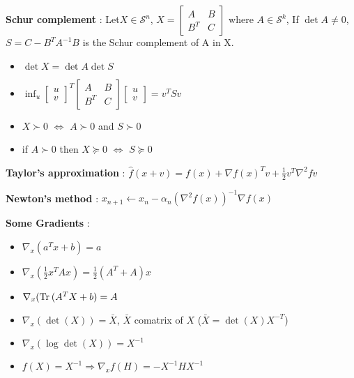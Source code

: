 \documentclass[a4paper, 10pt]{article}
\newcommand{\grad}[1]{\nabla{#1}}
\newcommand{\gradwrt}[2]{\nabla_#1{#2}}
\newcommand{\hess}[1]{\nabla^2{#1}}
\newcommand{\Sn}{\mathcal{S}^n}
\newcommand{\Tr}[1]{\text{Tr}\hspace{0.2em}#1}
\newcommand{\itm}[1]{{\color{itmcolor} \textbf{#1}}}
\begin{document}
\itm{Schur complement} : Let$X \in \Sn$, $X =
\begin{bmatrix}
    A & B \\
    B^T & C
  \end{bmatrix}$ where $A \in \mathcal{S}^k$, If $\det{A} \ne 0$,
  $S = C - B^T A^{-1} B$ is the Schur complement of A in X.
  \begin{itemize}
  \item $\det{X} = \det{A} \det{S}$
  \item $\inf_{u} \begin{bmatrix}
    u \\
    v
  \end{bmatrix}^T \begin{bmatrix}
    A & B \\
    B^T & C
  \end{bmatrix} \begin{bmatrix}
    u \\
    v
  \end{bmatrix}  = v^T S v$
\item $X \succ 0$ $\iff$ $A \succ 0$ and $S \succ 0$
\item if $A \succ 0$ then $X \succeq 0$ $\iff$ $S \succeq 0$
\end{itemize}

\itm{Taylor's approximation} : $\hat{f}(x + v) = f(x) + \grad{f}(x)^T v + \frac{1}{2} v^T \hess{f} v$

\itm{Newton's method} : $x_{n+1} \leftarrow x_n - \alpha_n(\hess{f}(x))^{-1} \grad{f}(x)$

\itm{Some Gradients} :
\begin{itemize}
\item $\gradwrt{x}{(a^T x + b)} = a$
\item $\gradwrt{x}{(\frac{1}{2}x^T A x)} = \frac{1}{2} (A^T + A) x$
\item $\gradwrt{x}{(\Tr(A^T X + b)} = A$
\item $\gradwrt{x}{(\det(X))} = \bar{X}$, $\bar{X}$ comatrix of $X$ ($\bar{X} = \det(X)X^{-T}$)
\item $\gradwrt{x}{(\log\det(X))} = X^{-1}$
\item $f(X) = X^{-1} \Rightarrow \gradwrt{x}{f}(H) = -X^{-1} H X^{-1}$
\end{itemize}


\end{document}
